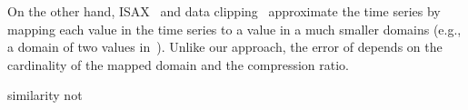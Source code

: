 \documentclass[10pt,conference,letterpaper]{IEEEtran}
\newcommand{\LNs}{hierarchical model index }
\begin{document}
On the other hand,  ISAX~\cite{isax,isax2} and data clipping~\cite{clipping} approximate the time series by mapping each value in the time series to a value in a much smaller domains (e.g., a domain of two values in~\cite{clipping}). 
Unlike our approach, the error of   depends on the cardinality of the mapped domain and the compression ratio.

similarity not 





 
\end{document}
